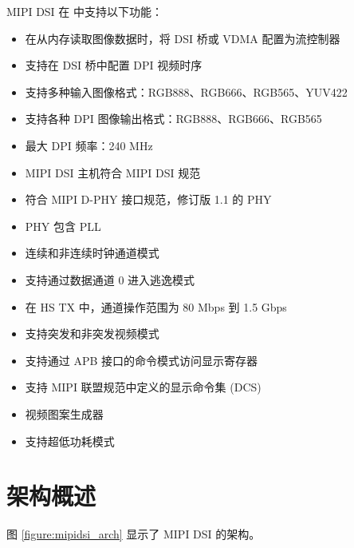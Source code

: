 \documentclass[main\_\_CN.tex]{subfiles}
\begin{document}
MIPI DSI 在 \chipname{} 中支持以下功能：
\begin{itemize}
    \item 在从内存读取图像数据时，将 DSI 桥或 VDMA 配置为流控制器
    \item 支持在 DSI 桥中配置 DPI 视频时序
    \item 支持多种输入图像格式：RGB888、RGB666、RGB565、YUV422
    \item 支持各种 DPI 图像输出格式：RGB888、RGB666、RGB565
    \item 最大 DPI 频率：240 MHz
    \item MIPI DSI 主机符合 MIPI DSI 规范
    \item 符合 MIPI D-PHY 接口规范，修订版 1.1 的 PHY
    \item PHY 包含 PLL
    \item 连续和非连续时钟通道模式
    \item 支持通过数据通道 0 进入逃逸模式
    \item 在 HS TX 中，通道操作范围为 80 Mbps 到 1.5 Gbps
    \item 支持突发和非突发视频模式
    \item 支持通过 APB 接口的命令模式访问显示寄存器
    \item 支持 MIPI 联盟规范中定义的显示命令集 (DCS)
    \item 视频图案生成器
    \item 支持超低功耗模式
\end{itemize}



\section{架构概述}
\label{sec:mipidsi-arch-overview}
图 \ref{figure:mipidsi_arch} 显示了 MIPI DSI 的架构。
\end{document}
